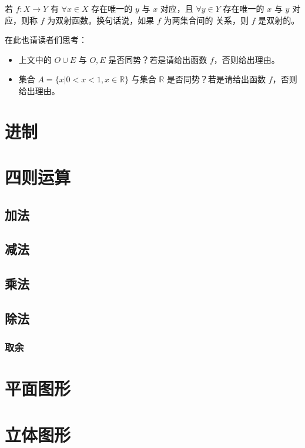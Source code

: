 若 $f: X \to Y$ 有 $\forall x \in X$ 存在唯一的 $y$ 与 $x$ 对应，且 $\forall y \in Y$ 存在唯一的 $x$ 与 $y$ 对应，则称 $f$ 为双射函数。换句话说，如果 $f$ 为两集合间的  关系，则 $f$ 是双射的。

在此也请读者们思考：

\begin{itemize}
  \item 上文中的 $O \cup E$ 与 $O, E$ 是否同势？若是请给出函数 $f$，否则给出理由。
  \item  集合 $A = \{x | 0 < x < 1, x \in \mathbb{R}\}$ 与集合 $\mathbb{R}$ 是否同势？若是请给出函数 $f$，否则给出理由。
\end{itemize}

\section{进制}

\section{四则运算}

\subsection{加法}

\subsection{减法}

\subsection{乘法}

\subsection{除法}

\subsubsection{取余}

\section{平面图形}

\section{立体图形}

